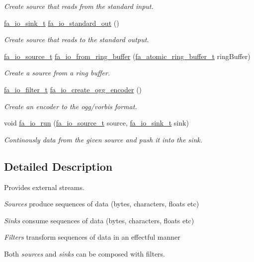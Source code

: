 \begin{DoxyCompactItemize}
\begin{DoxyCompactList}\small\item\em Create source that reads from the standard input. \end{DoxyCompactList}\item 
\hyperlink{group___fa_io_ga0d00d1e2c742abdba97597662815ce3a}{fa\-\_\-io\-\_\-sink\-\_\-t} \hyperlink{group___fa_io_ga8cd0d250bdd1193a418df62a7f0f7bb8}{fa\-\_\-io\-\_\-standard\-\_\-out} ()
\begin{DoxyCompactList}\small\item\em Create source that reads to the standard output. \end{DoxyCompactList}\item 
\hyperlink{group___fa_io_ga95a53a87c83414434e1afd3097b96ea4}{fa\-\_\-io\-\_\-source\-\_\-t} \hyperlink{group___fa_io_ga7fc84d8c573c3a2b7e6a7eb04d399634}{fa\-\_\-io\-\_\-from\-\_\-ring\-\_\-buffer} (\hyperlink{group___fa_atomic_ring_buffer_ga3482421740e66f489d94407a0d48a2d0}{fa\-\_\-atomic\-\_\-ring\-\_\-buffer\-\_\-t} ring\-Buffer)
\begin{DoxyCompactList}\small\item\em Create a source from a ring buffer. \end{DoxyCompactList}\item 
\hyperlink{group___fa_io_ga3e1f11810efcba3b45842e10c1425aba}{fa\-\_\-io\-\_\-filter\-\_\-t} \hyperlink{group___fa_io_ga3b642b72902c40600b387cf6097f01f7}{fa\-\_\-io\-\_\-create\-\_\-ogg\-\_\-encoder} ()
\begin{DoxyCompactList}\small\item\em Create an encoder to the {\ttfamily ogg/vorbis} format. \end{DoxyCompactList}\item 
void \hyperlink{group___fa_io_ga358e5b87997d711d52e841222c2eab5d}{fa\-\_\-io\-\_\-run} (\hyperlink{group___fa_io_ga95a53a87c83414434e1afd3097b96ea4}{fa\-\_\-io\-\_\-source\-\_\-t} source, \hyperlink{group___fa_io_ga0d00d1e2c742abdba97597662815ce3a}{fa\-\_\-io\-\_\-sink\-\_\-t} sink)
\begin{DoxyCompactList}\small\item\em Continously data from the given source and push it into the sink. \end{DoxyCompactList}\end{DoxyCompactItemize}


\subsection{Detailed Description}
Provides external streams. 
\begin{DoxyItemize}
\item {\itshape Sources} produce sequences of data (bytes, characters, floats etc)
\item {\itshape Sinks} consume sequences of data (bytes, characters, floats etc)
\item {\itshape Filters} transform sequences of data in an effectful manner
\item Both {\itshape sources} and {\itshape sinks} can be composed with filters.
\end{DoxyItemize}


